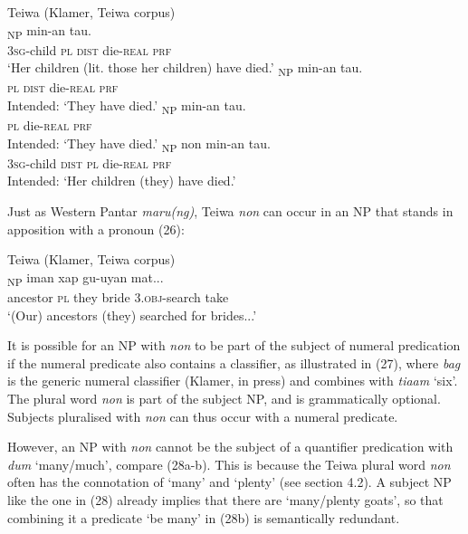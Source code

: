\ea%
\label{ex:25}
Teiwa (Klamer, Teiwa corpus)\\
\ea
{}\textsubscript{NP} min-an tau. \\
   \textsc{3sg}-child \textsc{pl} \textsc{dist} die-\textsc{real} \textsc{prf} \\
\glt `Her children (lit. those her children) have died.'
\ex
\gll *[Non u]\textsubscript{NP} min-an tau. \\
   \textsc{pl} \textsc{dist} die-\textsc{real} \textsc{prf} \\
\glt  Intended: `They have died.'
\ex
\gll *[{Non}]\textsubscript{NP} min-an tau. \\
    \textsc{pl} die-\textsc{real} \textsc{prf} \\
\glt  Intended: `They have died.'
\ex
\gll *[{G-oqai}   {u}]\textsubscript{NP} non min-an tau. \\
  \textsc{3sg}-child \textsc{dist} \textsc{pl} die-\textsc{real} \textsc{prf}  \\
\glt  Intended: `Her children (they) have died.'
\z
\z






Just as Western Pantar \textit{maru(ng)}, Teiwa \textit{non} can occur in an NP that stands in apposition with a pronoun (26):


\ea%
\label{ex:26}
Teiwa (Klamer, Teiwa corpus)\\
\textsubscript{NP} iman xap gu-uyan mat... \\
  ancestor \textsc{pl} they bride  3.\textsc{obj-}search take  \\
\glt `(Our) ancestors (they) searched for brides...'
\z






It is possible for an NP with \textit{non} to be part of the subject of numeral predication if the numeral predicate also contains a classifier, as illustrated in (27), where \textit{bag} is the generic numeral classifier (Klamer, in press) and combines with \textit{tiaam} `six'. The plural word \textit{non} is part of the subject NP, and is grammatically optional. Subjects pluralised with \textit{non} can thus occur with a numeral predicate.

However, an NP with \textit{non} cannot be the subject of a quantifier predication with \textit{dum} `many/much', compare (28a-b). This is because the Teiwa plural word \textit{non} often has the connotation of `many' and `plenty' (see section 4.2). A subject NP like the one in (28) already implies that there are `many/plenty goats', so that combining it a predicate `be many' in (28b) is semantically redundant.


